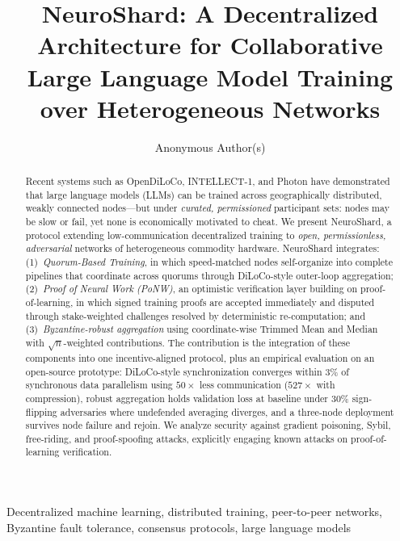 \documentclass[conference]{IEEEtran}
\begin{document}
\title{NeuroShard: A Decentralized Architecture for Collaborative Large Language Model Training over Heterogeneous Networks}

\author{Anonymous Author(s)}

\maketitle

\begin{abstract}
Recent systems such as OpenDiLoCo, INTELLECT-1, and Photon have demonstrated that large language models (LLMs) can be trained across geographically distributed, weakly connected nodes---but under \emph{curated, permissioned} participant sets: nodes may be slow or fail, yet none is economically motivated to cheat. We present NeuroShard, a protocol extending low-communication decentralized training to \emph{open, permissionless, adversarial} networks of heterogeneous commodity hardware. NeuroShard integrates: (1)~\emph{Quorum-Based Training}, in which speed-matched nodes self-organize into complete pipelines that coordinate across quorums through DiLoCo-style outer-loop aggregation; (2)~\emph{Proof of Neural Work (PoNW)}, an optimistic verification layer building on proof-of-learning, in which signed training proofs are accepted immediately and disputed through stake-weighted challenges resolved by deterministic re-computation; and (3)~\emph{Byzantine-robust aggregation} using coordinate-wise Trimmed Mean and Median with $\sqrt{n}$-weighted contributions. The contribution is the integration of these components into one incentive-aligned protocol, plus an empirical evaluation on an open-source prototype: DiLoCo-style synchronization converges within 3\% of synchronous data parallelism using $50\times$ less communication ($527\times$ with compression), robust aggregation holds validation loss at baseline under 30\% sign-flipping adversaries where undefended averaging diverges, and a three-node deployment survives node failure and rejoin. We analyze security against gradient poisoning, Sybil, free-riding, and proof-spoofing attacks, explicitly engaging known attacks on proof-of-learning verification.
\end{abstract}

\begin{IEEEkeywords}
Decentralized machine learning, distributed training, peer-to-peer networks, Byzantine fault tolerance, consensus protocols, large language models
\end{IEEEkeywords}
\end{document}
